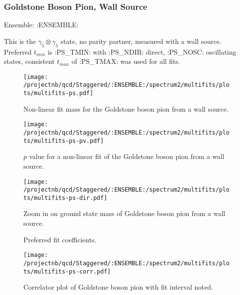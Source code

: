 \clearpage

\subsubsection{Goldstone Boson Pion, Wall Source}

Ensemble: :ENSEMBLE:

This is the $\gamma_5 \otimes \gamma_5$ state, no parity partner, measured with a wall source. Preferred $t_{min}$ is :PS_TMIN: with :PS_NDIR: direct, :PS_NOSC: oscillating states, consistent $t_{max}$ of :PS_TMAX: was used for all fits.

\begin{comment}
\begin{table}[ht!]
\centering
\scriptsize
\begin{tabular}{|c|c|c|c|}
\hline
 $t_{min}$ & $c_{\pi, GB}$ &  $M_{\pi, GB}$ & $p$-value \\
\hline

\end{tabular}
\caption{Fit values for the goldstone boson pion amplitude and mass, defined by the fit form in Section~\ref{sec:coshcorr}.}
\end{table}
\end{comment}

\begin{multicols}{2}
\begin{figure}[H]
\centering
\texttt{[image: /projectnb/qcd/Staggered/:ENSEMBLE:/spectrum2/multifits/plots/multifits-ps.pdf]}
\caption{Non-linear fit mass for the Goldstone boson pion from a wall source.}
\end{figure}
\columnbreak
\begin{figure}[H]
\centering
\texttt{[image: /projectnb/qcd/Staggered/:ENSEMBLE:/spectrum2/multifits/plots/multifits-ps-pv.pdf]}
\caption{$p$ value for a non-linear fit of the Goldstone boson pion from a wall source.}
\end{figure}
\end{multicols}

\begin{figure}[H]
\centering
\texttt{[image: /projectnb/qcd/Staggered/:ENSEMBLE:/spectrum2/multifits/plots/multifits-ps-dir.pdf]}
\caption{Zoom in on ground state mass of Goldstone boson pion from a wall source.}
\end{figure}

\begin{multicols}{2}
\begin{figure}[H]
\centering
\scriptsize

\caption{Preferred fit coefficients.}
\end{figure}
\columnbreak
\begin{figure}[H]
\centering
\texttt{[image: /projectnb/qcd/Staggered/:ENSEMBLE:/spectrum2/multifits/plots/multifits-ps-corr.pdf]}
\caption{Correlator plot of Goldstone boson pion with fit interval noted.}
\end{figure}
\end{multicols}

